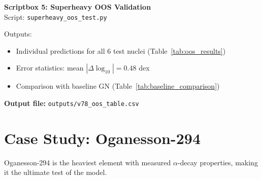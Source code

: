\documentclass[11pt,a4paper]{article}
\begin{document}
\begin{scriptbox}
\textbf{Scriptbox 5: Superheavy OOS Validation}\\
Script: \texttt{superheavy\_oos\_test.py}

Outputs:
\begin{itemize}[nosep]
    \item Individual predictions for all 6 test nuclei (Table~\ref{tab:oos_results})
    \item Error statistics: mean $|\Delta \log_{10}| = 0.48$ dex
    \item Comparison with baseline GN (Table~\ref{tab:baseline_comparison})
\end{itemize}

\textbf{Output file:} \texttt{outputs/v78\_oos\_table.csv}
\end{scriptbox}
\label{sb:superheavy}

\section{Case Study: Oganesson-294}
\label{sec:og294}

Oganesson-294 is the heaviest element with measured $\alpha$-decay properties, making it the ultimate test of the model.
\end{document}
